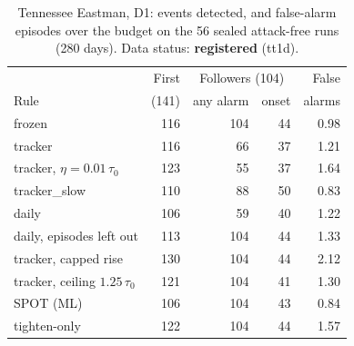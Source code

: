 \documentclass[sigconf,review,anonymous]{acmart}
\begin{document}
\begin{table}[t]
\caption{Tennessee Eastman, D1: events detected, and false-alarm episodes over the budget on the 56
sealed attack-free runs (280 days). Data status: \textbf{registered} (tt1d).}
\label{tab:tep}
\small
\begin{tabular}{@{}lrrrr@{}}
\toprule
 & First & \multicolumn{2}{c}{Followers (104)} & False \\
Rule & (141) & any alarm & onset & alarms \\
\midrule
frozen & 116 & 104 & 44 & 0.98 \\
tracker & 116 & 66 & 37 & 1.21 \\
tracker, $\eta = 0.01\,\tau_0$ & 123 & 55 & 37 & 1.64 \\
tracker\_slow & 110 & 88 & 50 & 0.83 \\
daily & 106 & 59 & 40 & 1.22 \\
daily, episodes left out & 113 & 104 & 44 & 1.33 \\
tracker, capped rise & 130 & 104 & 44 & 2.12 \\
tracker, ceiling $1.25\,\tau_0$ & 121 & 104 & 41 & 1.30 \\
SPOT (ML) & 106 & 104 & 43 & 0.84 \\
tighten-only & 122 & 104 & 44 & 1.57 \\
\bottomrule
\end{tabular}
\end{table}
\end{document}
